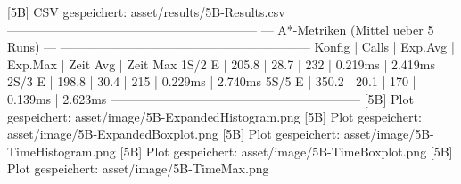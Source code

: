 [5B]      CSV gespeichert: asset/results/5B-Results.csv
------------------------------------------------------------
--- A*-Metriken (Mittel ueber 5 Runs) ---
------------------------------------------------------------
Konfig   | Calls | Exp.Avg | Exp.Max | Zeit Avg | Zeit Max
   1S/2  E | 205.8 |    28.7 |     232 |   0.219ms |   2.419ms
   2S/3  E | 198.8 |    30.4 |     215 |   0.229ms |   2.740ms
   5S/5  E | 350.2 |    20.1 |     170 |   0.139ms |   2.623ms
------------------------------------------------------------
[5B]      Plot gespeichert: asset/image/5B-ExpandedHistogram.png
[5B]      Plot gespeichert: asset/image/5B-ExpandedBoxplot.png
[5B]      Plot gespeichert: asset/image/5B-TimeHistogram.png
[5B]      Plot gespeichert: asset/image/5B-TimeBoxplot.png
[5B]      Plot gespeichert: asset/image/5B-TimeMax.png